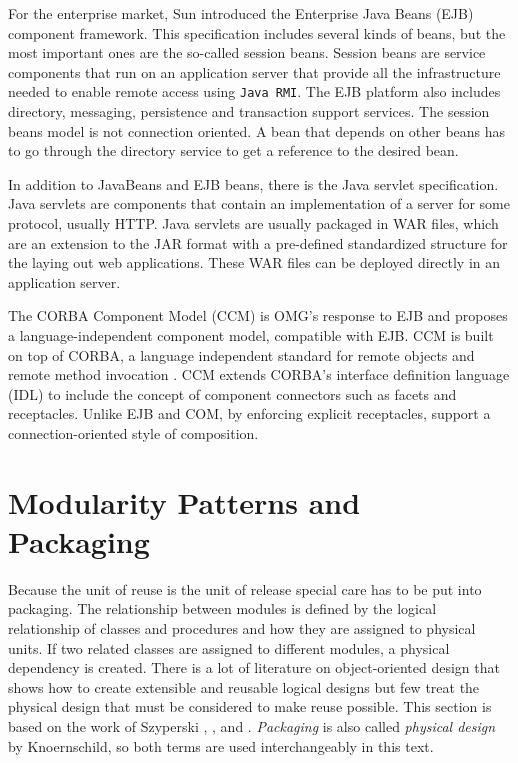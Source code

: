 For the enterprise market, Sun introduced the Enterprise Java Beans (EJB) component framework. This specification includes several kinds of beans,
but the most important ones are the so-called session beans. Session beans are service components that run on an application server that provide
all the infrastructure needed to enable remote access using \texttt{Java RMI}. The EJB platform also includes directory, messaging, persistence and
transaction support services. The session beans model is not connection oriented. A bean that depends on other beans has to go through the
directory service to get a reference to the desired bean.

In addition to JavaBeans and EJB beans, there is the Java servlet specification. Java servlets are components that contain an implementation
of a server for some protocol, usually HTTP. Java servlets are usually packaged in WAR files, which are an extension to the JAR format
with a pre-defined standardized structure for the laying out web applications. These WAR files can be deployed directly in an application server.

The CORBA Component Model (CCM) is OMG's response to EJB and proposes a language-independent component model, compatible with EJB. CCM is built
on top of CORBA, a language independent standard for remote objects and remote method invocation \cite{CCM}. CCM extends CORBA's interface definition language
(IDL) to include the concept of component connectors such as facets and receptacles. Unlike EJB and COM, by enforcing explicit receptacles, support
a connection-oriented style of composition.

\section{Modularity Patterns and Packaging}
\label{sec:patterns}

Because the unit of reuse is the unit of release special care has to be put into packaging.
The relationship between modules is defined by the logical relationship of classes and procedures
and how they are assigned to physical units. If two related classes are assigned to different
modules, a physical dependency is created. There is a lot of literature on object-oriented design
that shows how to create extensible and reusable logical designs but few treat the physical design
that must be considered to make reuse possible. This section is based on the work of Szyperski
\cite{Szyperski}, \cite{Lakos}, \cite{Martin} and \cite{Knoernschild}. \emph{Packaging} is also called
\emph{physical design} by Knoernschild, so both terms are used interchangeably in this text.

